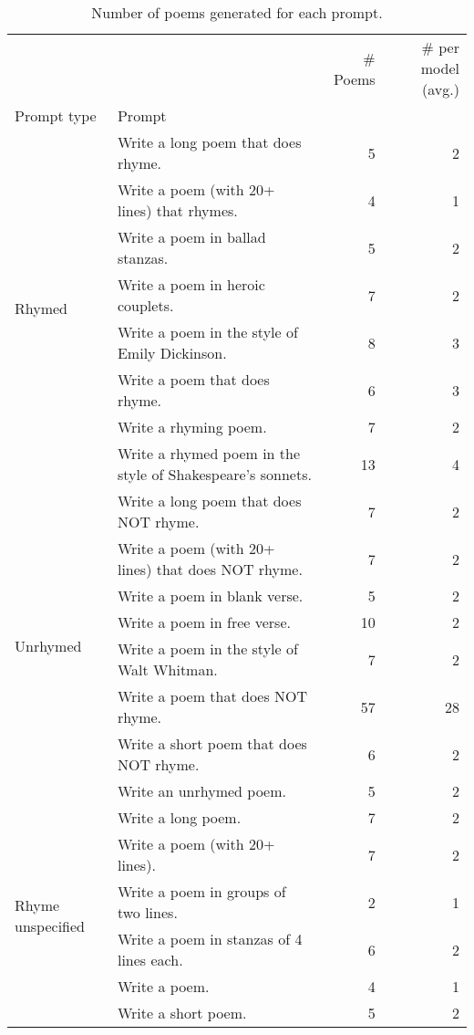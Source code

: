 \begin{table}[H]
  \centering
  \small
  \singlespacing
  \begin{tabular}{llrr}
  \toprule
   &  & \# Poems & \# per model (avg.) \\
  Prompt type & Prompt &  &  \\
  \midrule
  \multirow[t]{8}{*}{Rhymed} & Write a long poem that does rhyme. & 5 & 2 \\
   & Write a poem (with 20+ lines) that rhymes. & 4 & 1 \\
   & Write a poem in ballad stanzas. & 5 & 2 \\
   & Write a poem in heroic couplets. & 7 & 2 \\
   & Write a poem in the style of Emily Dickinson. & 8 & 3 \\
   & Write a poem that does rhyme. & 6 & 3 \\
   & Write a rhyming poem. & 7 & 2 \\
   & Write a rhymed poem in the style of Shakespeare's sonnets. & 13 & 4 \\
  \cline{1-4}
  \multirow[t]{8}{*}{Unrhymed} & Write a long poem that does NOT rhyme. & 7 & 2 \\
   & Write a poem (with 20+ lines) that does NOT rhyme. & 7 & 2 \\
   & Write a poem in blank verse. & 5 & 2 \\
   & Write a poem in free verse. & 10 & 2 \\
   & Write a poem in the style of Walt Whitman. & 7 & 2 \\
   & Write a poem that does NOT rhyme. & 57 & 28 \\
   & Write a short poem that does NOT rhyme. & 6 & 2 \\
   & Write an unrhymed poem. & 5 & 2 \\
  \cline{1-4}
  \multirow[t]{6}{*}{Rhyme unspecified} & Write a long poem. & 7 & 2 \\
   & Write a poem (with 20+ lines). & 7 & 2 \\
   & Write a poem in groups of two lines. & 2 & 1 \\
   & Write a poem in stanzas of 4 lines each. & 6 & 2 \\
   & Write a poem. & 4 & 1 \\
   & Write a short poem. & 5 & 2 \\
  \bottomrule
  \end{tabular}
  \caption{Number of poems generated for each prompt.}
  \label{tab:num_poems_rhyme_promptings}
\end{table}